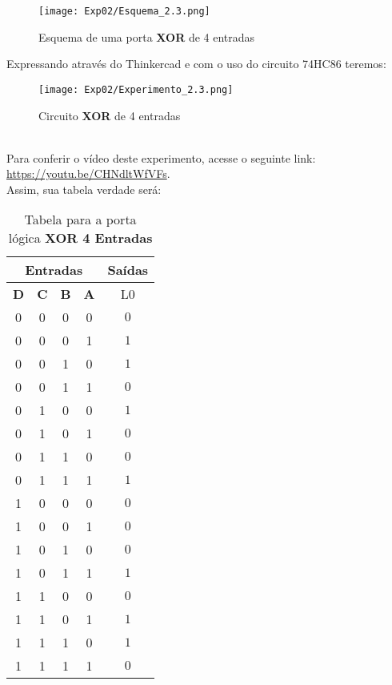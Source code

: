 \documentclass[12pt]{article}
\begin{document}
\begin{figure}[H]
    \centering
    \texttt{[image: Exp02/Esquema\_2.3.png]}
    \caption{Esquema de uma porta \textbf{XOR} de 4 entradas}\label{fig:Esquema_Experimento2_2.3}
\end{figure}

Expressando através do Thinkercad e com o uso do circuito 74HC86 teremos:

\begin{figure}[H]
    \centering
    \texttt{[image: Exp02/Experimento\_2.3.png]}
    \caption{Circuito \textbf{XOR} de 4 entradas}\label{fig:Esquema_Experimento2_2.3}
\end{figure}

\\
Para conferir o vídeo deste experimento, acesse o seguinte link:
\href{https://youtu.be/CHNdltWfVFs}{https://youtu.be/CHNdltWfVFs}.
\\
Assim, sua tabela verdade será:

\begin{table}[H]
    \centering
    \caption{Tabela para a porta lógica \textbf{XOR 4 Entradas}}
    \begin{tabular}{|c|c|c|c|c|}
    \hline
        \multicolumn{4}{|c|}{Entradas} & \multicolumn{1}{|c|}{Saídas}\\
    \hline
    \textbf{D} & \textbf{C} & \textbf{B} & \textbf{A} & L0\\
    \hline
    0 & 0 & 0 & 0 & \(0\) \\
    \hline
    0 & 0 & 0 & 1 & \(1\) \\
    \hline
    0 & 0 & 1 & 0 & \(1\) \\
    \hline
    0 & 0 & 1 & 1 & \(0\) \\
    \hline
    0 & 1 & 0 & 0 & \(1\) \\
    \hline
    0 & 1 & 0 & 1 & \(0\) \\
    \hline
    0 & 1 & 1 & 0 & \(0\) \\
    \hline
    0 & 1 & 1 & 1 & \(1\) \\
    \hline
    1 & 0 & 0 & 0 & \(0\) \\
    \hline
    1 & 0 & 0 & 1 & \(0\) \\
    \hline
    1 & 0 & 1 & 0 & \(0\) \\
    \hline
    1 & 0 & 1 & 1 & \(1\) \\
    \hline
    1 & 1 & 0 & 0 & \(0\) \\
    \hline
    1 & 1 & 0 & 1 & \(1\) \\
    \hline
    1 & 1 & 1 & 0 & \(1\) \\
    \hline
    1 & 1 & 1 & 1 & \(0\) \\
    \hline
    \end{tabular}
    \label{tab:tabela_and}
\end{table}
\end{document}
